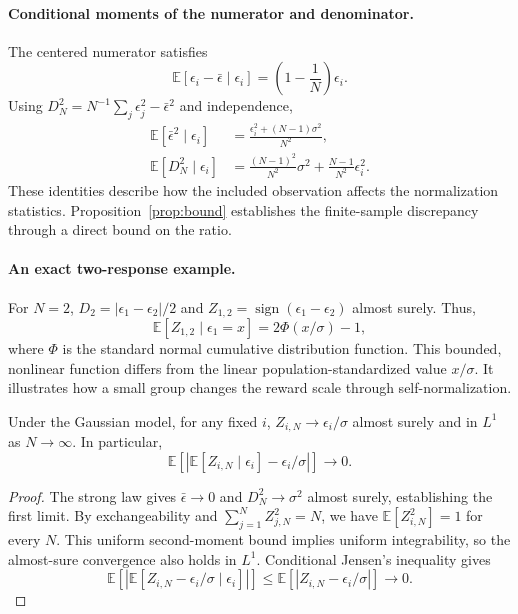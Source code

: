 \paragraph{Conditional moments of the numerator and denominator.}
The centered numerator satisfies
\begin{equation}
 \mathbb{E}[\epsilon_i-\bar\epsilon\mid\epsilon_i]
 =\left(1-\frac1N\right)\epsilon_i.
\end{equation}
Using $D_N^2=N^{-1}\sum_j\epsilon_j^2-\bar\epsilon^2$ and independence,
\begin{align}
 \mathbb{E}[\bar\epsilon^2\mid\epsilon_i]
 &=\frac{\epsilon_i^2+(N-1)\sigma^2}{N^2},\\
 \mathbb{E}[D_N^2\mid\epsilon_i]
 &=\frac{(N-1)^2}{N^2}\sigma^2+\frac{N-1}{N^2}\epsilon_i^2.
 \label{eq:condD2}
\end{align}
These identities describe how the included observation affects the normalization statistics. Proposition~\ref{prop:bound} establishes the finite-sample discrepancy through a direct bound on the ratio.

\paragraph{An exact two-response example.}
For $N=2$, $D_2=|\epsilon_1-\epsilon_2|/2$ and
$Z_{1,2}=\operatorname{sign}(\epsilon_1-\epsilon_2)$ almost surely. Thus,
\begin{equation}
 \mathbb{E}[Z_{1,2}\mid\epsilon_1=x]=2\Phi(x/\sigma)-1,
 \label{eq:two_sample}
\end{equation}
where $\Phi$ is the standard normal cumulative distribution function. This bounded, nonlinear function differs from the linear population-standardized value $x/\sigma$. It illustrates how a small group changes the reward scale through self-normalization.

\begin{proposition}\label{prop:limit}
Under the Gaussian model, for any fixed $i$, $Z_{i,N}\to\epsilon_i/\sigma$ almost surely and in $L^1$ as $N\to\infty$. In particular,
\begin{equation}
 \mathbb{E}\left[\left|\mathbb{E}[Z_{i,N}\mid\epsilon_i]-\epsilon_i/\sigma\right|\right]\longrightarrow0.
\end{equation}
\end{proposition}
\begin{proof}
The strong law gives $\bar\epsilon\to0$ and $D_N^2\to\sigma^2$ almost surely, establishing the first limit. By exchangeability and $\sum_{j=1}^{N}Z_{j,N}^2=N$, we have $\mathbb{E}[Z_{i,N}^2]=1$ for every $N$. This uniform second-moment bound implies uniform integrability, so the almost-sure convergence also holds in $L^1$. Conditional Jensen's inequality gives
\begin{equation}
 \mathbb{E}\left[\left|\mathbb{E}[Z_{i,N}-\epsilon_i/\sigma\mid\epsilon_i]\right|\right]
 \leq\mathbb{E}\left[|Z_{i,N}-\epsilon_i/\sigma|\right]\to0.
\end{equation}
\end{proof}

